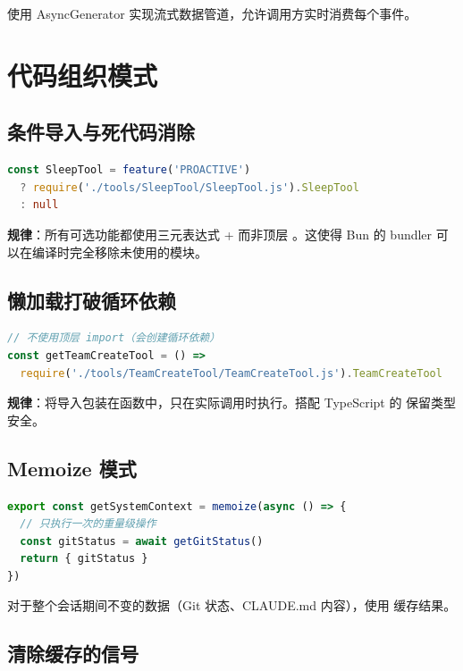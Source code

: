 使用 AsyncGenerator 实现流式数据管道，允许调用方实时消费每个事件。

\section{代码组织模式}

\subsection{条件导入与死代码消除}

\begin{lstlisting}[language=TypeScript,breaklines=true]
const SleepTool = feature('PROACTIVE')
  ? require('./tools/SleepTool/SleepTool.js').SleepTool
  : null
\end{lstlisting}

\textbf{规律}：所有可选功能都使用三元表达式 +  而非顶层 。这使得 Bun 的 bundler 可以在编译时完全移除未使用的模块。

\subsection{懒加载打破循环依赖}

\begin{lstlisting}[language=TypeScript,breaklines=true]
// 不使用顶层 import（会创建循环依赖）
const getTeamCreateTool = () =>
  require('./tools/TeamCreateTool/TeamCreateTool.js').TeamCreateTool
\end{lstlisting}

\textbf{规律}：将导入包装在函数中，只在实际调用时执行。搭配 TypeScript 的  保留类型安全。

\subsection{Memoize 模式}

\begin{lstlisting}[language=TypeScript,breaklines=true]
export const getSystemContext = memoize(async () => {
  // 只执行一次的重量级操作
  const gitStatus = await getGitStatus()
  return { gitStatus }
})
\end{lstlisting}

对于整个会话期间不变的数据（Git 状态、CLAUDE.md 内容），使用  缓存结果。

\subsection{清除缓存的信号}

